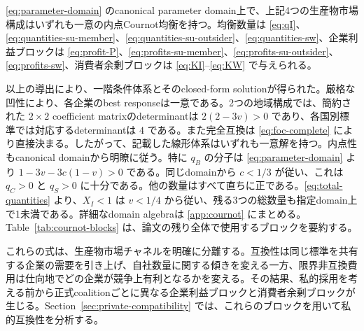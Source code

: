 \begin{lemma}[Cournot均衡の構成ブロック]
\label{lem:cournot-blocks}
\eqref{eq:parameter-domain} のcanonical parameter domain上で、上記4つの生産物市場構成はいずれも一意の内点Cournot均衡を持つ。均衡数量は \eqref{eq:qI}、\eqref{eq:quantities-su-member}、\eqref{eq:quantities-su-outsider}、\eqref{eq:quantities-sw}、企業利益ブロックは \eqref{eq:profit-P}、\eqref{eq:profits-su-member}、\eqref{eq:profits-su-outsider}、\eqref{eq:profits-sw}、消費者余剰ブロックは \eqref{eq:KI}--\eqref{eq:KW} で与えられる。
\end{lemma}

以上の導出により、一階条件体系とそのclosed-form solutionが得られた。厳格な凹性により、各企業のbest responseは一意である。2つの地域構成では、簡約された $2\times2$ coefficient matrixのdeterminantは $2(2-3v)>0$ であり、各国別標準では対応するdeterminantは $4$ である。また完全互換は \eqref{eq:foc-complete} により直接決まる。したがって、記載した線形体系はいずれも一意解を持つ。内点性もcanonical domainから明瞭に従う。特に $q_B$ の分子は \eqref{eq:parameter-domain} より $1-3v-3c(1-v)>0$ である。同じdomainから $c<1/3$ が従い、これは $q_C>0$ と $q_S>0$ に十分である。他の数量はすべて直ちに正である。\eqref{eq:total-quantities} より、$X_I<1$ は $v<1/4$ から従い、残る3つの総数量も指定domain上で1未満である。詳細なdomain algebraは \ref{app:cournot} にまとめる。Table~\ref{tab:cournot-blocks} は、論文の残り全体で使用するブロックを要約する。



これらの式は、生産物市場チャネルを明確に分離する。互換性は同じ標準を共有する企業の需要を引き上げ、自社数量に関する傾きを変える一方、限界非互換費用は仕向地でどの企業が競争上有利となるかを変える。その結果、私的採用を考える前から正式coalitionごとに異なる企業利益ブロックと消費者余剰ブロックが生じる。Section~\ref{sec:private-compatibility} では、これらのブロックを用いて私的互換性を分析する。
